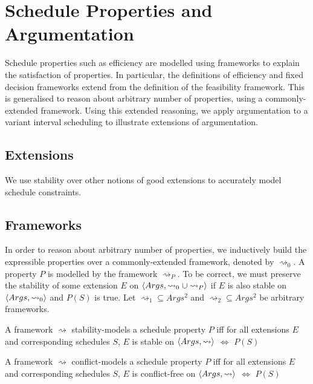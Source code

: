 \chapter{Schedule Properties and Argumentation}

Schedule properties such as efficiency are modelled using frameworks to explain the satisfaction of properties. In particular, the definitions of efficiency and fixed decision frameworks extend from the definition of the feasibility framework. This is generalised to reason about arbitrary number of properties, using a commonly-extended framework. Using this extended reasoning, we apply argumentation to a variant interval scheduling to illustrate extensions of argumentation.
 
\section{Extensions}

We use stability over other notions of good extensions to accurately model schedule constraints.

\section{Frameworks}

In order to reason about arbitrary number of properties, we inductively build the expressible properties over a commonly-extended framework, denoted by $\rightsquigarrow_0$. A property $P$ is modelled by the framework $\rightsquigarrow_P$. To be correct, we must preserve the stability of some extension $E$ on $\langle{Args},{\rightsquigarrow_0\cup\rightsquigarrow_P}\rangle$ if $E$ is also stable on $\langle{Args},{\rightsquigarrow_0}\rangle$ and $P(S)$ is true. Let $\rightsquigarrow_1\subseteq Args^2$ and $\rightsquigarrow_2\subseteq Args^2$ be arbitrary frameworks.

\begin{definition}
	A framework $\rightsquigarrow$ stability-models a schedule property $P$ iff for all extensions $E$ and corresponding schedules $S$, $E$ is stable on $\langle{Args},{\rightsquigarrow}\rangle$ $\Leftrightarrow$ $P(S)$
\end{definition}

\begin{definition}
	A framework $\rightsquigarrow$ conflict-models a schedule property $P$ iff for all extensions $E$ and corresponding schedules $S$, $E$ is conflict-free on $\langle{Args},{\rightsquigarrow}\rangle$ $\Leftrightarrow$ $P(S)$
\end{definition}

